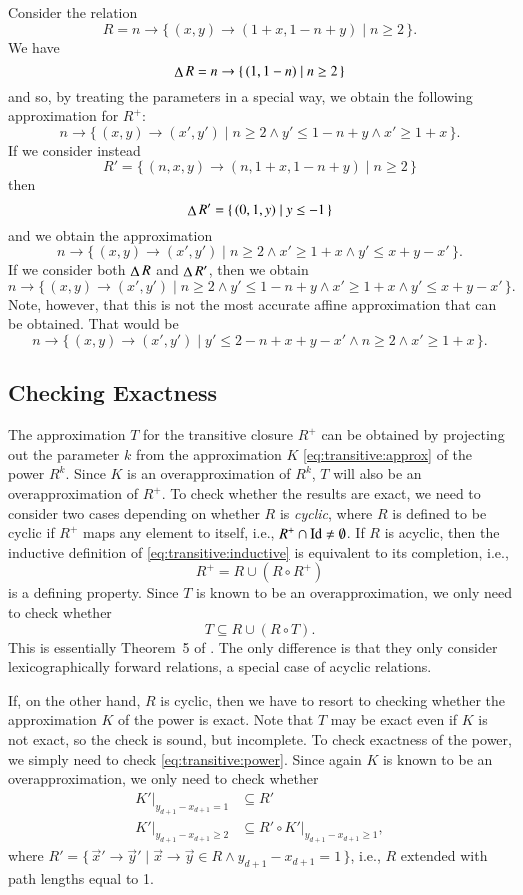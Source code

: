 \begin{example}
Consider the relation
$$
R = n \to \{\, (x, y) \to (1 + x, 1 - n + y) \mid n \ge 2 \,\}
.
$$
We have
$$
\mathop{\Delta}\nolimits R = n \to \{\, (1, 1 - n) \mid n \ge 2 \,\}
$$
and so, by treating the parameters in a special way, we obtain
the following approximation for $R^+$:
$$
n \to \{\, (x, y) \to (x', y') \mid n \ge 2 \wedge y' \le 1 - n + y \wedge x' \ge 1 + x \,\}
.
$$
If we consider instead
$$
R' = \{\, (n, x, y) \to (n, 1 + x, 1 - n + y) \mid n \ge 2 \,\}
$$
then
$$
\mathop{\Delta}\nolimits R' = \{\, (0, 1, y) \mid y \le -1 \,\}
$$
and we obtain the approximation
$$
n \to \{\, (x, y) \to (x', y') \mid n \ge 2 \wedge x' \ge 1 + x \wedge y' \le x + y - x' \,\}
.
$$
If we consider both $\mathop{\Delta}\nolimits R$ and $\mathop{\Delta}\nolimits R'$, then we obtain
$$
n \to \{\, (x, y) \to (x', y') \mid n \ge 2 \wedge y' \le 1 - n + y \wedge x' \ge 1 + x \wedge y' \le x + y - x' \,\}
.
$$
Note, however, that this is not the most accurate affine approximation that
can be obtained.  That would be
$$
n \to \{\, (x, y) \to (x', y') \mid y' \le 2 - n + x + y - x' \wedge n \ge 2 \wedge x' \ge 1 + x \,\}
.
$$
\end{example}

\subsection{Checking Exactness}

The approximation $T$ for the transitive closure $R^+$ can be obtained
by projecting out the parameter $k$ from the approximation $K$
\eqref{eq:transitive:approx} of the power $R^k$.
Since $K$ is an overapproximation of $R^k$, $T$ will also be an
overapproximation of $R^+$.
To check whether the results are exact, we need to consider two
cases depending on whether $R$ is {\em cyclic}, where $R$ is defined
to be cyclic if $R^+$ maps any element to itself, i.e.,
$R^+ \cap \mathop{\rm Id}\nolimits \ne \emptyset$.
If $R$ is acyclic, then the inductive definition of
\eqref{eq:transitive:inductive} is equivalent to its completion,
i.e.,
$$
R^+ = R \cup \left(R \circ R^+\right)
$$
is a defining property.
Since $T$ is known to be an overapproximation, we only need to check
whether
$$
T \subseteq R \cup \left(R \circ T\right)
.
$$
This is essentially Theorem~5 of .
The only difference is that they only consider lexicographically
forward relations, a special case of acyclic relations.

If, on the other hand, $R$ is cyclic, then we have to resort
to checking whether the approximation $K$ of the power is exact.
Note that $T$ may be exact even if $K$ is not exact, so the check
is sound, but incomplete.
To check exactness of the power, we simply need to check
\eqref{eq:transitive:power}.  Since again $K$ is known
to be an overapproximation, we only need to check whether
$$
\begin{aligned}
K'|_{y_{d+1} - x_{d+1} = 1} & \subseteq R'
\\
K'|_{y_{d+1} - x_{d+1} \ge 2} & \subseteq R' \circ K'|_{y_{d+1} - x_{d+1} \ge 1}
,
\end{aligned}
$$
where $R' = \{\, \vec x' \to \vec y' \mid \vec x \to \vec y \in R
\wedge y_{d+1} - x_{d+1} = 1\,\}$, i.e., $R$ extended with path
lengths equal to 1.

